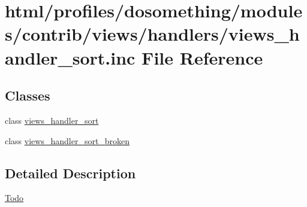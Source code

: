 \hypertarget{views__handler__sort_8inc}{
\section{html/profiles/dosomething/modules/contrib/views/handlers/views\_\-handler\_\-sort.inc File Reference}
\label{views__handler__sort_8inc}
}
\subsection*{Classes}
\begin{DoxyCompactItemize}
\item 
class \hyperlink{classviews__handler__sort}{views\_\-handler\_\-sort}
\item 
class \hyperlink{classviews__handler__sort__broken}{views\_\-handler\_\-sort\_\-broken}
\end{DoxyCompactItemize}


\subsection{Detailed Description}
\begin{Desc}
\item[\hyperlink{todo__todo000047}{Todo}]\end{Desc}
